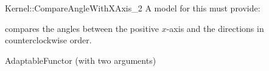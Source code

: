 \begin{ccRefFunctionObjectConcept}{Kernel::CompareAngleWithXAxis_2}
A model for this must provide:


 {compares
  the angles between the positive $x$-axis and the directions in
  counterclockwise order.}

\ccRefines
AdaptableFunctor (with two arguments)

\end{ccRefFunctionObjectConcept}
